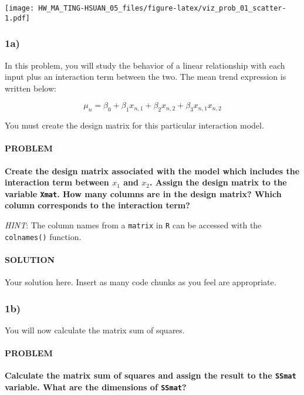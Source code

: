 \documentclass[
]{article}
\begin{document}
\texttt{[image: HW\_MA\_TING-HSUAN\_05\_files/figure-latex/viz\_prob\_01\_scatter-1.pdf]}

\hypertarget{a}{%
\subsubsection{1a)}\label{a}}

In this problem, you will study the behavior of a linear relationship
with each input plus an interaction term between the two. The mean trend
expression is written below:

\[ 
\mu_n = \beta_0 + \beta_1 x_{n,1} + \beta_2 x_{n,2} + \beta_3 x_{n,1} x_{n,2}
\]

You must create the design matrix for this particular interaction model.

\hypertarget{problem}{%
\paragraph{PROBLEM}\label{problem}}

\textbf{Create the design matrix associated with the model which
includes the interaction term between \(x_1\) and \(x_2\). Assign the
design matrix to the variable \texttt{Xmat}. How many columns are in the
design matrix? Which column corresponds to the interaction term?}

\emph{HINT}: The column names from a \texttt{matrix} in \texttt{R} can
be accessed with the \texttt{colnames()} function.

\hypertarget{solution}{%
\paragraph{SOLUTION}\label{solution}}

Your solution here. Insert as many code chunks as you feel are
appropriate.

\hypertarget{b}{%
\subsubsection{1b)}\label{b}}

You will now calculate the matrix sum of squares.

\hypertarget{problem-1}{%
\paragraph{PROBLEM}\label{problem-1}}

\textbf{Calculate the matrix sum of squares and assign the result to the
\texttt{SSmat} variable. What are the dimensions of \texttt{SSmat}?}
\end{document}
